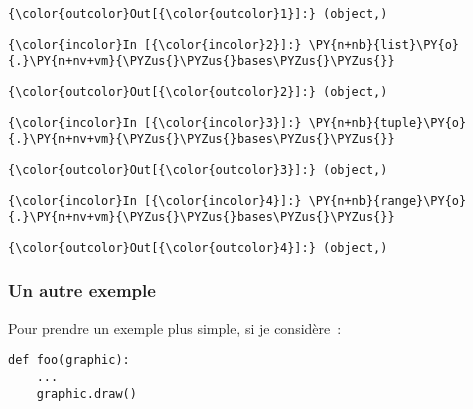 \begin{Verbatim}[commandchars=\\\{\}]
{\color{outcolor}Out[{\color{outcolor}1}]:} (object,)
\end{Verbatim}
            
    \begin{Verbatim}[commandchars=\\\{\}]
{\color{incolor}In [{\color{incolor}2}]:} \PY{n+nb}{list}\PY{o}{.}\PY{n+nv+vm}{\PYZus{}\PYZus{}bases\PYZus{}\PYZus{}}
\end{Verbatim}


\begin{Verbatim}[commandchars=\\\{\}]
{\color{outcolor}Out[{\color{outcolor}2}]:} (object,)
\end{Verbatim}
            
    \begin{Verbatim}[commandchars=\\\{\}]
{\color{incolor}In [{\color{incolor}3}]:} \PY{n+nb}{tuple}\PY{o}{.}\PY{n+nv+vm}{\PYZus{}\PYZus{}bases\PYZus{}\PYZus{}}
\end{Verbatim}


\begin{Verbatim}[commandchars=\\\{\}]
{\color{outcolor}Out[{\color{outcolor}3}]:} (object,)
\end{Verbatim}
            
    \begin{Verbatim}[commandchars=\\\{\}]
{\color{incolor}In [{\color{incolor}4}]:} \PY{n+nb}{range}\PY{o}{.}\PY{n+nv+vm}{\PYZus{}\PYZus{}bases\PYZus{}\PYZus{}}
\end{Verbatim}


\begin{Verbatim}[commandchars=\\\{\}]
{\color{outcolor}Out[{\color{outcolor}4}]:} (object,)
\end{Verbatim}
            
    \hypertarget{un-autre-exemple}{%
\subsubsection{Un autre exemple}\label{un-autre-exemple}}

    Pour prendre un exemple plus simple, si je considère~:

\begin{verbatim}
def foo(graphic):
    ...
    graphic.draw()
\end{verbatim}

